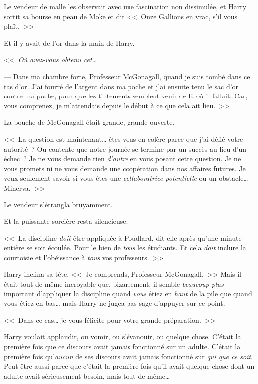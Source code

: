 Le vendeur de malle les observait avec une fascination non dissimulée, et Harry sortit sa bourse en peau de Moke et dit <<~Onze Gallions en vrac, s'il vous plaît.~>>

Et il y avait de l'or dans la main de Harry.

<<~\emph{Où avez-vous obtenu cet…}

--- Dans ma chambre forte, Professeur McGonagall, quand je suis tombé dans ce tas d'or. J'ai fourré de l'argent dans ma poche et j'ai ensuite tenu le sac d'or contre ma poche, pour que les tintements semblent venir de là où il fallait. Car, vous comprenez, je m'attendais depuis le début à ce que cela ait lieu.~>>

La bouche de McGonagall était grande, grande ouverte.

<<~La question est maintenant… êtes-vous en colère parce que j'ai défié votre autorité~? Ou contente que notre journée se termine par un succès au lieu d'un échec~? Je ne vous demande rien \emph{d'autre} en vous posant cette question. Je ne vous promets ni ne vous demande une coopération dans nos affaires futures. Je veux seulement savoir si vous êtes une \emph{collaboratrice potentielle} ou un obstacle… Minerva.~>>

Le vendeur s'étrangla bruyamment.

Et la puissante sorcière resta silencieuse.

<<~La discipline \emph{doit} être appliquée à Poudlard, dit-elle après qu'une minute entière se soit écoulée. Pour le bien de \emph{tous} les étudiants. Et cela \emph{doit} inclure la courtoisie et l'obéissance à \emph{tous} vos professeurs.~>>

Harry inclina sa tête. <<~Je comprends, Professeur McGonagall.~>> Mais il était tout de même incroyable que, bizarrement, il semble \emph{beaucoup plus} important d'appliquer la discipline quand \emph{vous} étiez en \emph{haut} de la pile que quand vous étiez en bas… mais Harry ne jugea pas sage d'appuyer sur ce point.

<<~Dans ce cas… je vous félicite pour votre grande préparation.~>>

Harry voulait applaudir, ou vomir, ou s'évanouir, ou quelque chose. C'était la première fois que ce discours avait jamais fonctionné sur un adulte. C'était la première fois qu'\emph{aucun} de ses discours avait jamais fonctionné sur \emph{qui que ce soit}. Peut-être aussi parce que c'était la première fois qu'il avait quelque chose dont un adulte avait sérieusement besoin, mais tout de même…

